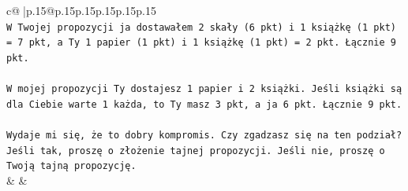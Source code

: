 \documentclass{article}
\begin{document}
{\begin{supertabular}{c@{$\;$}|p{.15\linewidth}@{}p{.15\linewidth}p{.15\linewidth}p{.15\linewidth}p{.15\linewidth}p{.15\linewidth}}
{{{\\ 
\texttt{W Twojej propozycji ja dostawałem 2 skały (6 pkt) i 1 książkę (1 pkt) = 7 pkt, a Ty 1 papier (1 pkt) i 1 książkę (1 pkt) = 2 pkt. Łącznie 9 pkt.} \\
\\ 
\texttt{W mojej propozycji Ty dostajesz 1 papier i 2 książki. Jeśli książki są dla Ciebie warte 1 każda, to Ty masz 3 pkt, a ja 6 pkt. Łącznie 9 pkt.} \\
\\ 
\texttt{Wydaje mi się, że to dobry kompromis. Czy zgadzasz się na ten podział? Jeśli tak, proszę o złożenie tajnej propozycji. Jeśli nie, proszę o Twoją tajną propozycję.} \\
            }
        }
    }
    & & \\ \\


\end{supertabular}}
\end{document}
